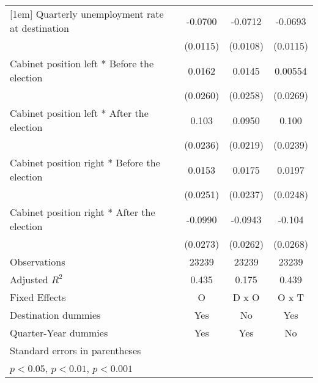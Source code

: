 \begin{table}[htbp]
\begin{tabular}{l*{3}{c}}
[1em]
Quarterly unemployment rate at destination&     -0.0700\sym{***}&     -0.0712\sym{***}&     -0.0693\sym{***}\\
                    &    (0.0115)         &    (0.0108)         &    (0.0115)         \\
[1em]
Cabinet position left * Before the election&      0.0162         &      0.0145         &     0.00554         \\
                    &    (0.0260)         &    (0.0258)         &    (0.0269)         \\
[1em]
Cabinet position left * After the election&       0.103\sym{***}&      0.0950\sym{***}&       0.100\sym{***}\\
                    &    (0.0236)         &    (0.0219)         &    (0.0239)         \\
[1em]
Cabinet position right * Before the election&      0.0153         &      0.0175         &      0.0197         \\
                    &    (0.0251)         &    (0.0237)         &    (0.0248)         \\
[1em]
Cabinet position right * After the election&     -0.0990\sym{***}&     -0.0943\sym{***}&      -0.104\sym{***}\\
                    &    (0.0273)         &    (0.0262)         &    (0.0268)         \\
\hline
Observations        &       23239         &       23239         &       23239         \\
Adjusted \(R^{2}\)  &       0.435         &       0.175         &       0.439         \\
Fixed Effects       &           O         &       D x O         &       O x T         \\
Destination dummies &         Yes         &          No         &         Yes         \\
Quarter-Year dummies&         Yes         &         Yes         &          No         \\
\hline\hline
\multicolumn{4}{l}{\footnotesize Standard errors in parentheses}\\
\multicolumn{4}{l}{\footnotesize \sym{*} \(p<0.05\), \sym{**} \(p<0.01\), \sym{***} \(p<0.001\)}\\
\end{tabular}
\end{table}
